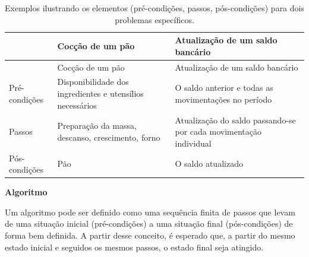 \documentclass[
  11pt,
  a4paper,
]{scrbook}
\begin{document}
\begin{longtable}[]{@{}
  >{\raggedright\arraybackslash}p{}
  >{\raggedright\arraybackslash}p{}
  >{\raggedright\arraybackslash}p{}@{}}
\caption{Exemplos ilustrando os elementos (pré-condições, passos,
pós-condições) para dois problemas
específicos.}\label{tbl-exemplos-condicoes-algoritmos}\tabularnewline
\toprule\noalign{}
\begin{minipage}[b]{\linewidth}\raggedright
\end{minipage} & \begin{minipage}[b]{\linewidth}\raggedright
Cocção de um pão
\end{minipage} & \begin{minipage}[b]{\linewidth}\raggedright
Atualização de um saldo bancário
\end{minipage} \\
\midrule\noalign{}
\endfirsthead
\toprule\noalign{}
\begin{minipage}[b]{\linewidth}\raggedright
\end{minipage} & \begin{minipage}[b]{\linewidth}\raggedright
Cocção de um pão
\end{minipage} & \begin{minipage}[b]{\linewidth}\raggedright
Atualização de um saldo bancário
\end{minipage} \\
\midrule\noalign{}
\endhead
\bottomrule\noalign{}
\endlastfoot
Pré-condições & Disponibilidade dos ingredientes e utensílios
necessários & O saldo anterior e todas as movimentações no período \\
Passos & Preparação da massa, descanso, crescimento, forno & Atualização
do saldo passando-se por cada movimentação individual \\
Pós-condições & Pão & O saldo atualizado \\
\end{longtable}

\begin{tcolorbox}[enhanced jigsaw, colback=white, arc=.35mm, colframe=quarto-callout-color-frame, toprule=.15mm, leftrule=.75mm, left=2mm, rightrule=.15mm, bottomrule=.15mm, opacityback=0, breakable]

\vspace{-3mm}\textbf{Algoritmo}\vspace{3mm}

 Um algoritmo pode ser definido como uma sequência
finita de passos que levam de uma situação inicial (pré-condições) a uma
situação final (pós-condições) de forma bem definida. A partir desse
conceito, é esperado que, a partir do mesmo estado inicial e seguidos os
mesmos passos, o estado final seja atingido.

\end{tcolorbox}
\end{document}
